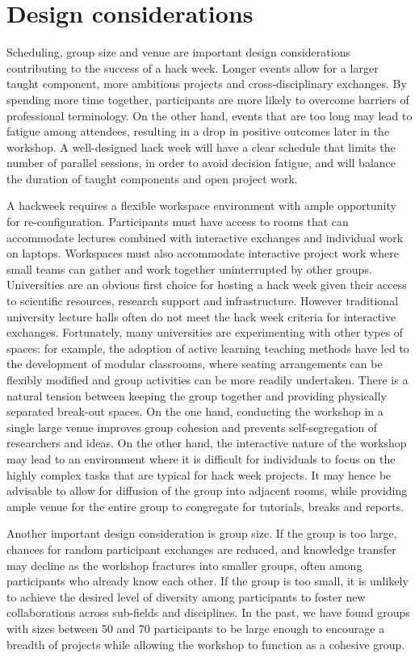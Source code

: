 \section*{Design considerations}

Scheduling, group size and venue are important design considerations contributing to the success of a hack week.   
Longer events allow for a larger taught component, more ambitious projects and cross-disciplinary exchanges. 
By spending more time together, participants are more likely to overcome barriers of professional terminology.
On the other hand, events that are too long may lead to fatigue among attendees, resulting in a drop in positive outcomes later in the workshop.
A well-designed hack week will have a clear schedule that limits the number of parallel sessions, in order to avoid decision fatigue, and will balance the duration of taught components and open project work. 

A hackweek requires a flexible workspace environment with ample opportunity for re-configuration. 
Participants must have access to rooms that can accommodate lectures combined with interactive exchanges and individual work on laptops. 
Workspaces must also accommodate interactive project work where small teams can gather and work together uninterrupted by other groups.    
Universities are an obvious first choice for hosting a hack week given their access to scientific resources, research support and infrastructure. 
However traditional university lecture halls often do not meet the hack week criteria for interactive exchanges.
Fortunately, many universities are experimenting with other types of spaces: for example, the adoption of active learning teaching methods \cite{prince2004} have led to the development of modular classrooms, where seating arrangements can be flexibly modified and group activities can be more readily undertaken. There is a natural tension between keeping the group together and providing physically separated break-out spaces. On the one hand, conducting the workshop in a single large venue improves group cohesion and prevents self-segregation of researchers and ideas. On the other hand, the interactive nature of the workshop may lead to an environment where it is difficult for individuals to focus on the highly complex tasks that are typical for hack week projects. It may hence be advisable to allow for diffusion of the group into adjacent rooms, while providing ample venue for the entire group to congregate for tutorials, breaks and reports.

Another important design consideration is group size.
If the group is too large, chances for random participant exchanges are reduced, and knowledge transfer may decline as the workshop fractures into smaller groups, often among participants who already know each other.
If the group is too small, it is unlikely to achieve the desired level of diversity among participants to foster new collaborations across sub-fields and disciplines.
In the past, we have found groups with sizes between 50 and 70 participants to be large enough to encourage a breadth of projects while allowing the workshop to function as a cohesive group.

